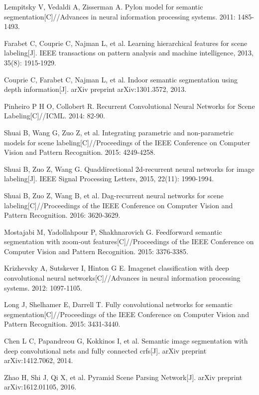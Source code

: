 \documentclass[10.5pt,compsoc]{TsT}
\theoremstyle{mystyle}
\begin{document}
{\begin{thebibliography}{99}
Lempitsky V, Vedaldi A, Zisserman A. Pylon model for semantic segmentation[C]//Advances in neural information processing systems. 2011: 1485-1493.

Farabet C, Couprie C, Najman L, et al. Learning hierarchical features for scene labeling[J]. IEEE transactions on pattern analysis and machine intelligence, 2013, 35(8): 1915-1929.

Couprie C, Farabet C, Najman L, et al. Indoor semantic segmentation using depth information[J]. arXiv preprint arXiv:1301.3572, 2013.

Pinheiro P H O, Collobert R. Recurrent Convolutional Neural Networks for Scene Labeling[C]//ICML. 2014: 82-90.

Shuai B, Wang G, Zuo Z, et al. Integrating parametric and non-parametric models for scene labeling[C]//Proceedings of the IEEE Conference on Computer Vision and Pattern Recognition. 2015: 4249-4258.

Shuai B, Zuo Z, Wang G. Quaddirectional 2d-recurrent neural networks for image labeling[J]. IEEE Signal Processing Letters, 2015, 22(11): 1990-1994.

Shuai B, Zuo Z, Wang B, et al. Dag-recurrent neural networks for scene labeling[C]//Proceedings of the IEEE Conference on Computer Vision and Pattern Recognition. 2016: 3620-3629.

Mostajabi M, Yadollahpour P, Shakhnarovich G. Feedforward semantic segmentation with zoom-out features[C]//Proceedings of the IEEE Conference on Computer Vision and Pattern Recognition. 2015: 3376-3385.

Krizhevsky A, Sutskever I, Hinton G E. Imagenet classification with deep convolutional neural networks[C]//Advances in neural information processing systems. 2012: 1097-1105.

Long J, Shelhamer E, Darrell T. Fully convolutional networks for semantic segmentation[C]//Proceedings of the IEEE Conference on Computer Vision and Pattern Recognition. 2015: 3431-3440.

Chen L C, Papandreou G, Kokkinos I, et al. Semantic image segmentation with deep convolutional nets and fully connected crfs[J]. arXiv preprint arXiv:1412.7062, 2014.

Zhao H, Shi J, Qi X, et al. Pyramid Scene Parsing Network[J]. arXiv preprint arXiv:1612.01105, 2016.


\end{thebibliography}}
\end{document}

